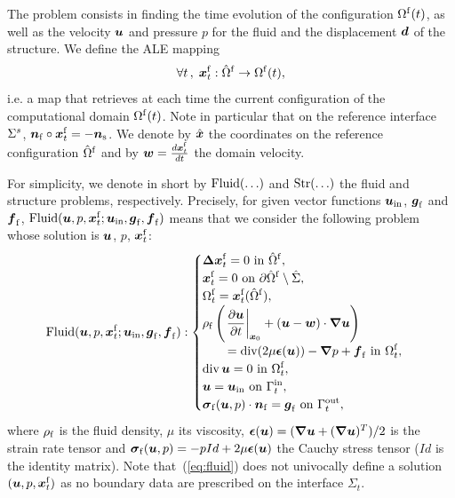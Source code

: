 The problem consists in finding the time evolution of the
configuration $\OmegaFt$, as well as the velocity $\uu u$ and
pressure $p$ for the fluid and the displacement $\D$ of
the structure. We define the ALE mapping
\begin{equation*}
 \forall t \,,\;  \ALE{t} : \hOmegaF \rightarrow \OmegaFt,
\end{equation*}
i.e. a map that retrieves at each time the current configuration
of the computational domain $\OmegaFt$. Note in particular that on
the reference interface $\hWall$, $\uu n_\mf \circ \ALE{t} = -\uu
n_\ms$. We denote by $\bY$ the coordinates on the reference
configuration $\hOmegaF$ and by $\bw=\frac{d \ALE{t}}{dt}$ the
domain velocity.

\medskip
For simplicity, we denote in short by $\NS(\ldots)$ and
$\Str(\ldots)$ the fluid and structure problems, respectively.
Precisely, for given vector functions $\uu u_\In$, $\uu g_\mf$ and
$\uu f_\mf$, $\NS(\U,p,\ALE{t};\uu u_\In, \uu g_\mf, \uu f_\mf)$
means that we consider the following problem whose solution is
$\U$, $p$, $\ALE{t}$:
\begin{equation}\label{eq:fluid}
  \NS(\U,p,\ALE{t};\uu u_\In, \uu g_\mf, \uu f_\mf):
  \begin{cases}
    \dis  \uu \Delta \ALE{t} = 0 \text{ in } \hOmegaF, \\
    \dis  \ALE{t} = 0 \text{ on } \partial\hOmegaF \setminus\hat\Sigma, \\
    \dis  \OmegaF_{t} = \ALE{t}(\hOmegaF), \\
    \dis  \rho_\mf\left(\diffALE \U + (\U-\bw)\cdot \Grad \U\right) \\
    \dis  \qquad = \Div (2\mu\uu \epsilon(\U)) - \Grad p  + \uu f_\mf \text{ in }\OmegaF_{t}, \\
    \dis  \Div\U=0 \text{ in }\OmegaF_{t},\\
    \dis  \U = \uu u_\In \text{ on } \GamIn_t,\\
    \dis  \uu\sigma_\mf (\uu u,p)\cdot\uu n_\mf = \uu g_\mf \text{ on }\GamOu_{t},
  \end{cases}
\end{equation}
where $\rho_\mf$ is the fluid density, $\mu$ its viscosity,
$\strain(\U) = \Strain u$ is the strain rate tensor and $\uu
\sigma_\mf(\U,p)=-p Id + 2\mu\strain(\U)$ the Cauchy stress
tensor ($ Id $ is the identity matrix). Note
that~(\ref{eq:fluid}) does not univocally define a solution
$(\U,p,\ALE{t})$ as no boundary data are prescribed on the
interface $\Sigma_t$.


